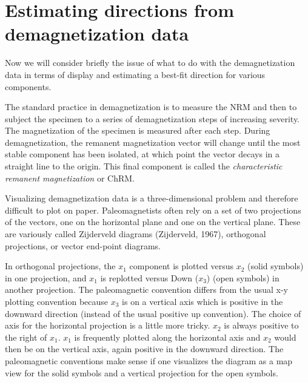 \section {Estimating directions from demagnetization data}
\label{sect:chrm}

 Now we will consider briefly the issue of what to do with the demagnetization data in terms of display and estimating a best-fit direction for various components.

The standard practice in demagnetization is to measure the NRM and then
to subject the specimen
 to a series of demagnetization steps  of increasing
severity.
The magnetization of the specimen is measured after each step.
During demagnetization,
the remanent magnetization vector will change  until 
the most stable component has been isolated, 
at which point the
vector decays in  a straight line
 to the origin.  This final component is called the 
{\it characteristic remanent magnetization} or ChRM.  





Visualizing demagnetization data is a
three-dimensional problem and therefore
difficult to plot on paper. Paleomagnetists  often rely on a set
of two projections of the vectors, one on the horizontal plane and one on the
vertical plane.  These are variously called
Zijderveld diagrams (Zijderveld, 1967),\nocite{zijderveld67} orthogonal
projections, or vector end-point diagrams.  


 In orthogonal projections, the
 $x_1$  component is plotted versus $x_2$ (solid
symbols) in one projection,
  and $x_1$ is replotted versus Down ($x_3$) (open symbols) in
another projection.   The
paleomagnetic convention differs from the usual x-y plotting convention
because $x_3$ is on a vertical axis which is positive in the downward direction (instead of the usual positive up convention).  The choice of axis for the horizontal projection is a little more tricky.  $x_2$ is always positive to the right of $x_1$.   $x_1$ is frequently plotted along the horizontal axis and $x_2$ would then be on the vertical axis, again positive in the downward direction.  The paleomagnetic conventions make sense if one visualizes the diagram as a map view for the solid symbols and a vertical projection for the open symbols. 

